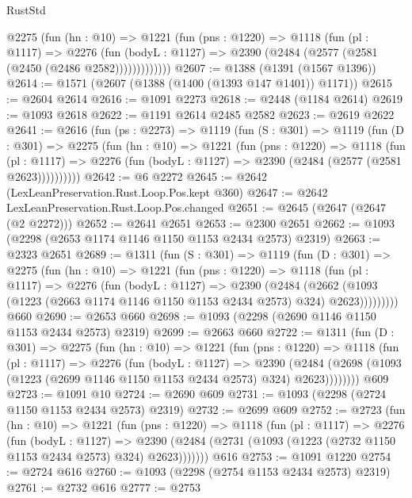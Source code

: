 \begin{lexlean}{RustStd}
\begin{coremodule}
{\begin{coremodule}
{{{{{{{{          @2275
            (fun (hn : @10) =>
            @1221
              (fun (pns : @1220) =>
              @1118
                (fun (pl : @1117) =>
                @2276
                  (fun (bodyL : @1127) =>
                  @2390 (@2484 (@2577 (@2581 (@2450 (@2486 @2582)))))))))))))
@2607 := @1388 (@1391 (@1567 @1396))
@2614 := @1571 (@2607 (@1388 (@1400 (@1393 @147 @1401)) @1171))
@2615 := @2604 @2614
@2616 := @1091 @2273
@2618 := @2448 (@1184 @2614)
@2619 := @1093 @2618
@2622 := @1191 @2614 @2485 @2582
@2623 := @2619 @2622
@2641 := @2616
    (fun (ps : @2273) =>
    @1119
      (fun (S : @301) =>
      @1119
        (fun (D : @301) =>
        @2275
          (fun (hn : @10) =>
          @1221
            (fun (pns : @1220) =>
            @1118
              (fun (pl : @1117) =>
              @2276 (fun (bodyL : @1127) => @2390 (@2484 (@2577 (@2581 @2623))))))))))
@2642 := @6 @2272
@2645 := @2642 (LexLeanPreservation.Rust.Loop.Pos.kept @360)
@2647 := @2642 LexLeanPreservation.Rust.Loop.Pos.changed
@2651 := @2645 (@2647 (@2647 (@2 @2272)))
@2652 := @2641 @2651
@2653 := @2300 @2651
@2662 := @1093 (@2298 (@2653 @1174 @1146 @1150 @1153 @2434 @2573) @2319)
@2663 := @2323 @2651
@2689 := @1311
    (fun (S : @301) =>
    @1119
      (fun (D : @301) =>
      @2275
        (fun (hn : @10) =>
        @1221
          (fun (pns : @1220) =>
          @1118
            (fun (pl : @1117) =>
            @2276
              (fun (bodyL : @1127) =>
              @2390
                (@2484
                  (@2662
                    (@1093 (@1223 (@2663 @1174 @1146 @1150 @1153 @2434 @2573) @324) @2623)))))))))
    @660
@2690 := @2653 @660
@2698 := @1093 (@2298 (@2690 @1146 @1150 @1153 @2434 @2573) @2319)
@2699 := @2663 @660
@2722 := @1311
    (fun (D : @301) =>
    @2275
      (fun (hn : @10) =>
      @1221
        (fun (pns : @1220) =>
        @1118
          (fun (pl : @1117) =>
          @2276
            (fun (bodyL : @1127) =>
            @2390
              (@2484 (@2698 (@1093 (@1223 (@2699 @1146 @1150 @1153 @2434 @2573) @324) @2623))))))))
    @609
@2723 := @1091 @10
@2724 := @2690 @609
@2731 := @1093 (@2298 (@2724 @1150 @1153 @2434 @2573) @2319)
@2732 := @2699 @609
@2752 := @2723
    (fun (hn : @10) =>
    @1221
      (fun (pns : @1220) =>
      @1118
        (fun (pl : @1117) =>
        @2276
          (fun (bodyL : @1127) =>
          @2390 (@2484 (@2731 (@1093 (@1223 (@2732 @1150 @1153 @2434 @2573) @324) @2623)))))))
    @616
@2753 := @1091 @1220
@2754 := @2724 @616
@2760 := @1093 (@2298 (@2754 @1153 @2434 @2573) @2319)
@2761 := @2732 @616
@2777 := @2753
}}}}}}}}
\end{coremodule}}
\end{coremodule}
\end{lexlean}
